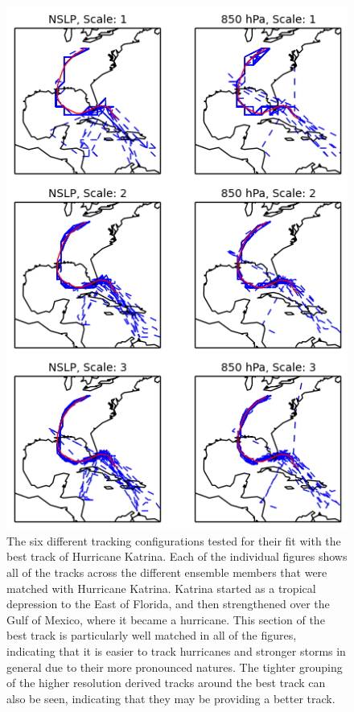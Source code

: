 \documentclass[pdftex,12pt,a4paper]{report}
\begin{document}
\begin{figure}[hbp]
    \centering
    \includegraphics[width=4.5in]{figures/katrina_six_tracking_configs}
    \caption{The six different tracking configurations tested for their fit with the best track of
        Hurricane Katrina. Each of the individual figures shows all of the tracks across the
        different ensemble members that were matched with Hurricane Katrina. Katrina started as a
        tropical depression to the East of Florida, and then strengthened over the Gulf of Mexico,
        where it became a hurricane. This section of the best track is particularly well matched in all
        of the figures, indicating that it is easier to track hurricanes and stronger storms in general due
        to their more pronounced natures. The tighter grouping of the higher resolution derived tracks
        around the best track can also be seen, indicating that they may be providing a better track. }
    \label{fig:katrina_six_tracking_configs}
\end{figure}
\end{document}
